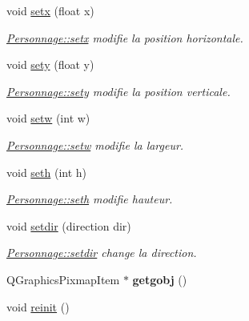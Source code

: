 \begin{DoxyCompactItemize}
void \hyperlink{class_personnage_a017efb88daf72424a7b1e23431bcf60f}{setx} (float x)
\begin{DoxyCompactList}\small\item\em \hyperlink{class_personnage_a017efb88daf72424a7b1e23431bcf60f}{Personnage\+::setx} modifie la position horizontale. \end{DoxyCompactList}\item 
void \hyperlink{class_personnage_ac91b7c71a7f25e3e1696469e7012383d}{sety} (float y)
\begin{DoxyCompactList}\small\item\em \hyperlink{class_personnage_ac91b7c71a7f25e3e1696469e7012383d}{Personnage\+::sety} modifie la position verticale. \end{DoxyCompactList}\item 
void \hyperlink{class_personnage_adb1c763969fee6521f870a21b2593387}{setw} (int w)
\begin{DoxyCompactList}\small\item\em \hyperlink{class_personnage_adb1c763969fee6521f870a21b2593387}{Personnage\+::setw} modifie la largeur. \end{DoxyCompactList}\item 
void \hyperlink{class_personnage_a27cec3441dcb29cdd98aceb107e0a6d4}{seth} (int h)
\begin{DoxyCompactList}\small\item\em \hyperlink{class_personnage_a27cec3441dcb29cdd98aceb107e0a6d4}{Personnage\+::seth} modifie hauteur. \end{DoxyCompactList}\item 
void \hyperlink{class_personnage_a4f68109b5502cf8dd451cfde07ea0f80}{setdir} (direction dir)
\begin{DoxyCompactList}\small\item\em \hyperlink{class_personnage_a4f68109b5502cf8dd451cfde07ea0f80}{Personnage\+::setdir} change la direction. \end{DoxyCompactList}\item 
\hypertarget{class_personnage_aa0e21a766208ea65c9929a8121e18dbe}{}Q\+Graphics\+Pixmap\+Item $\ast$ {\bfseries getgobj} ()\label{class_personnage_aa0e21a766208ea65c9929a8121e18dbe}

\item 
\hypertarget{class_personnage_a99c5442355ae6ebd56f34055a114ba69}{}void \hyperlink{class_personnage_a99c5442355ae6ebd56f34055a114ba69}{reinit} ()\label{class_personnage_a99c5442355ae6ebd56f34055a114ba69}


\end{DoxyCompactItemize}
